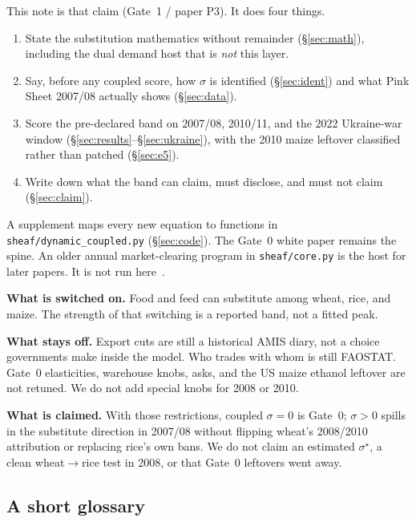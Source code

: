 \documentclass[11pt,a4paper]{article}
\begin{document}
This note is that claim (Gate~1 / paper P3). It does four things.

\begin{enumerate}
\item State the substitution mathematics without remainder
      (\S\ref{sec:math}), including the dual demand host that is
      \emph{not} this layer.
\item Say, before any coupled score, how \(\sigma\) is identified
      (\S\ref{sec:ident}) and what Pink Sheet 2007/08 actually shows
      (\S\ref{sec:data}).
\item Score the pre-declared band on 2007/08, 2010/11, and the 2022
      Ukraine-war window (\S\ref{sec:results}--\S\ref{sec:ukraine}),
      with the 2010 maize leftover classified rather than patched
      (\S\ref{sec:e5}).
\item Write down what the band can claim, must disclose, and must not
      claim (\S\ref{sec:claim}).
\end{enumerate}

A supplement maps every new equation to functions in
\texttt{sheaf/dynamic\_coupled.py} (\S\ref{sec:code}). The Gate~0 white
paper remains the spine. An older annual market-clearing program in
\texttt{sheaf/core.py} is the host for later papers. It is not run
here~\citep{takayama1971,samuelson1952}.

\textbf{What is switched on.} Food and feed can substitute among wheat,
rice, and maize. The strength of that switching is a reported band, not a
fitted peak.

\textbf{What stays off.} Export cuts are still a historical AMIS diary,
not a choice governments make inside the model. Who trades with whom is
still FAOSTAT. Gate~0 elasticities, warehouse knobs, asks, and the US
maize ethanol leftover are not retuned. We do not add special knobs for
2008 or 2010.

\textbf{What is claimed.} With those restrictions, coupled \(\sigma=0\) is
Gate~0; \(\sigma>0\) spills in the substitute direction in 2007/08 without
flipping wheat's 2008/2010 attribution or replacing rice's own bans. We do
not claim an estimated \(\sigma^\star\), a clean wheat\(\to\)rice test in
2008, or that Gate~0 leftovers went away.

\subsection{A short glossary}
\end{document}
